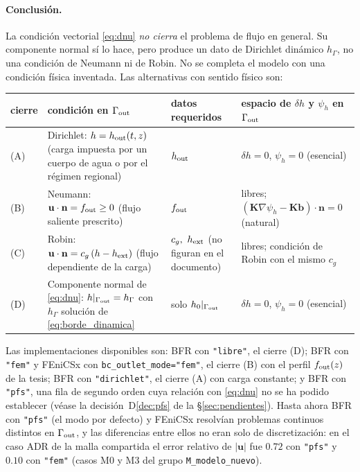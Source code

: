 \documentclass[11pt]{article}
\numberwithin{equation}{section}
\theoremstyle{plain}
\theoremstyle{definition}
\theoremstyle{remark}
\newcommand{\bu}{\mathbf{u}}
\newcommand{\bK}{\mathbf{K}}
\newcommand{\bn}{\mathbf{n}}
\newcommand{\bb}{\mathbf{b}}
\begin{document}
\paragraph{Conclusión.} La condición vectorial \eqref{eq:dnu} \emph{no cierra} el problema de flujo en general. Su componente normal sí lo hace, pero produce un dato de Dirichlet
dinámico $h_\Gamma$, no una condición de Neumann ni de Robin. No se completa el modelo con una condición física inventada. Las alternativas con sentido físico son:
\begin{center}\small
\begin{tabular}{p{1.0cm}p{5.4cm}p{3.3cm}p{4.5cm}}
\toprule
cierre & condición en $\Gamma_{\rm out}$ & datos requeridos & espacio de $\delta h$ y $\psi_h$ en $\Gamma_{\rm out}$ \\
\midrule
(A) & Dirichlet: $h=h_{\rm out}(t,z)$ (carga impuesta por un cuerpo de agua o por el régimen regional) & $h_{\rm out}$ & $\delta h=0$, $\psi_h=0$ (esencial) \\
(B) & Neumann: $\bu\cdot\bn=f_{\rm out}\ge0$ (flujo saliente prescrito) & $f_{\rm out}$ & libres; $(\bK\nabla\psi_h-\bK\bb)\cdot\bn=0$ (natural) \\
(C) & Robin: $\bu\cdot\bn=c_g\,(h-h_{\rm ext})$ (flujo dependiente de la carga) & $c_g,\ h_{\rm ext}$ (no figuran en el documento) & libres; condición de Robin con el mismo $c_g$ \\
(D) & Componente normal de \eqref{eq:dnu}: $h|_{\Gamma_{\rm out}}=h_\Gamma$ con $h_\Gamma$ solución de \eqref{eq:borde_dinamica} & solo $h_0|_{\Gamma_{\rm out}}$ & $\delta h=0$, $\psi_h=0$ (esencial) \\
\bottomrule
\end{tabular}
\end{center}
Las implementaciones disponibles son: BFR con \texttt{"libre"}, el cierre (D); BFR con \texttt{"fem"} y FEniCSx con \texttt{bc\_outlet\_mode="fem"}, el cierre (B) con el perfil $f_{\rm out}(z)$ de la tesis; BFR con \texttt{"dirichlet"}, el cierre (A) con carga constante; y BFR con \texttt{"pfs"}, una fila de
segundo orden cuya relación con \eqref{eq:dnu} no se ha podido establecer (véase la decisión~D\ref{dec:pfs} de la \S\ref{sec:pendientes}). Hasta ahora BFR con \texttt{"pfs"} (el modo por defecto) y FEniCSx resolvían
problemas continuos distintos en $\Gamma_{\rm out}$, y las diferencias entre ellos no eran solo de discretización: en el caso ADR de la malla compartida el error relativo de $|\bu|$
fue $0.72$ con \texttt{"pfs"} y $0.10$ con \texttt{"fem"} (casos M0 y M3 del grupo \texttt{M\_modelo\_nuevo}).
\end{document}
